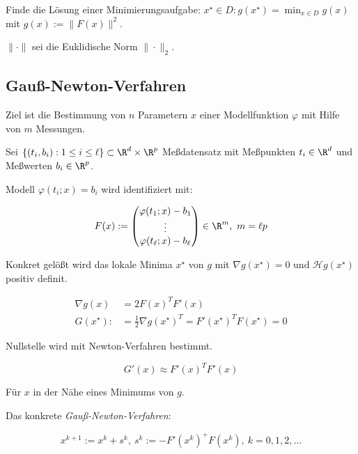 \vspace*{1mm}

Finde die Lösung einer Minimierungsaufgabe: $x^\star \in D : g(x^\star) = \min_{x \in D}g(x)$ mit $g(x) := \|F(x)\|^2$.

\vspace*{1mm}

$\|\cdot\|$ sei die Euklidische Norm $\|\cdot\|_2$.

\subsection*{Gauß-Newton-Verfahren}

Ziel ist die Bestimmung von $n$ Parametern $x$ einer Modellfunktion $\varphi$ mit Hilfe von $m$ Messungen.

Sei $\{(t_i,b_i) : 1 \leq i \leq \ell\} \subset \R^d \times \R^p$ Meßdatensatz mit Meßpunkten $t_i \in \R^d$ und Meßwerten $b_i \in \R^p$.

\columnbreak

Modell $\varphi(t_i;x) = b_i$ wird identifiziert mit:

\vspace*{-2mm}
$$F(x) := \begin{pmatrix} \varphi(t_1;x) - b_1 \\ \vdots \\ \varphi(t_\ell;x) - b_\ell \end{pmatrix} \in \R^m, \ m=\ell p$$

Konkret gelößt wird das lokale Minima $x^\star$ von $g$ mit $\nabla g(x^\star) = 0$ und $\mathcal{H}g(x^\star)$ positiv definit.

\vspace*{-4mm}
\begin{align*}
	\nabla g(x) &= 2F(x)^T F'(x) \\
	G(x^\star) :&= \frac{1}{2} \nabla g(x^\star)^T = F'(x^\star)^T F(x^\star) = 0
\end{align*}

Nullstelle wird mit Newton-Verfahren bestimmt.

\vspace*{-2mm}
$$G'(x) \approx F'(x)^T F'(x)$$

Für $x$ in der Nähe eines Minimums von $g$.

Das konkrete \emph{Gauß-Newton-Verfahren}:

\vspace{-4mm}
$$x^{k+1} := x^k + s^k, \ s^k := -F'(x^k)^+ F(x^k), \ k = 0,1,2,\dots$$

